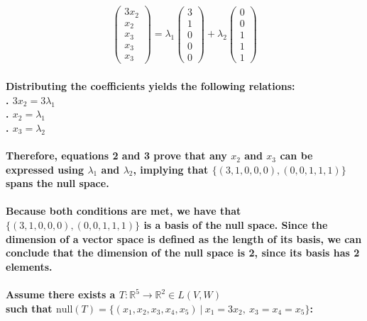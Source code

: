 \documentclass{article}
\begin{document}
\begin{align*}
\begin{pmatrix}
    3x_2 \\ x_2 \\ x_3 \\ x_3 \\ x_3
\end{pmatrix}
=
\lambda_1
\begin{pmatrix}
    3 \\ 1 \\ 0 \\ 0 \\ 0
\end{pmatrix}
+ \lambda_2
\begin{pmatrix}
    0 \\ 0 \\ 1 \\ 1 \\ 1
\end{pmatrix}
\end{align*}

\paragraph{\large
Distributing the coefficients yields the following relations:
\\. $3x_2 = 3\lambda_1$
\\. $x_2 = \lambda_1$\
\\. $x_3 = \lambda_2$}

\paragraph{\large
Therefore, equations 2 and 3 prove that any $x_2$ and $x_3$ can be expressed using $\lambda_1$ and $\lambda_2$, implying that $\{(3, 1, 0, 0, 0), (0, 0, 1, 1, 1)\}$ spans the null space.}

\paragraph{\large
Because both conditions are met, we have that $\{(3, 1, 0, 0, 0), (0, 0, 1, 1, 1)\}$ is a basis of the null space. Since the dimension of a vector space is defined as the length of its basis, we can conclude that the dimension of the null space is 2, since its basis has 2 elements.}

\paragraph{\large
Assume there exists a $T: \mathbb{R}^5 \rightarrow \mathbb{R}^2 \in L(V, W)$ \\such that $\mathrm{null}(T) = \{(x_1,x_2,x_3,x_4,x_5)\ |\ x_1 = 3 x_2,\ x_3 = x_4 = x_5\}$:}
\end{document}
